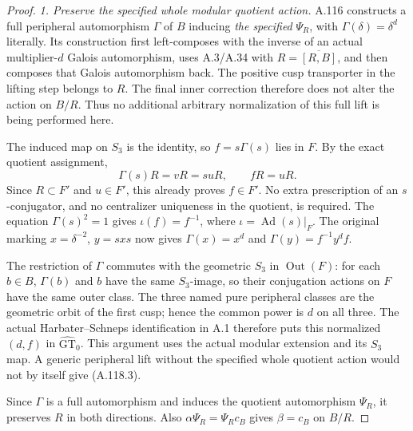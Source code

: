 \begin{proof}
\emph{1. Preserve the specified whole modular quotient action.}
A.116 constructs a full peripheral automorphism \(\Gamma\) of \(B\)
inducing \emph{the specified} \(\Psi_R\), with
\(\Gamma(\delta)=\delta^d\) literally. Its construction first
left-composes with the inverse of an actual multiplier-\(d\) Galois
automorphism, uses A.3/A.34 with \(R=\overline{[R,B]}\), and then
composes that Galois automorphism back. The positive cusp transporter
in the lifting step belongs to \(R\). The final inner correction
therefore does not alter the action on \(B/R\).
Thus no additional arbitrary normalization of this full lift is
being performed here.

The induced map on \(S_3\) is the identity, so
\(f=s\Gamma(s)\) lies in \(F\). By the exact quotient assignment,
\[
 \Gamma(s)R=vR=suR,\qquad fR=uR.                              \tag{A.118.3}
\]
Since \(R\subset F'\) and \(u\in F'\), this already proves
\(f\in F'\). No extra prescription of an \(s\)-conjugator, and no
centralizer uniqueness in the quotient, is required.
The equation \(\Gamma(s)^2=1\) gives
\(\iota(f)=f^{-1}\), where \(\iota=\operatorname{Ad}(s)|_F\).
The original marking \(x=\delta^{-2}\), \(y=sxs\) now gives
\(\Gamma(x)=x^d\) and \(\Gamma(y)=f^{-1}y^df\).

The restriction of \(\Gamma\) commutes with the geometric
\(S_3\) in \(\operatorname{Out}(F)\): for each \(b\in B\),
\(\Gamma(b)\) and \(b\) have the same \(S_3\)-image, so their
conjugation actions on \(F\) have the same outer class.
The three named pure peripheral classes are the geometric orbit
of the first cusp; hence the common power is \(d\) on all three.
The actual Harbater--Schneps identification in A.1 therefore puts
this normalized \((d,f)\) in \(\widehat{\mathrm{GT}}_0\).
This argument uses the actual modular extension and its \(S_3\)
map. A generic peripheral lift without the specified whole quotient
action would not by itself give (A.118.3).

Since \(\Gamma\) is a full automorphism and induces the quotient
automorphism \(\Psi_R\), it preserves \(R\) in both directions.
Also \(\alpha\Psi_R=\Psi_Rc_B\) gives
\(\beta=c_B\) on \(B/R\).


\end{proof}

